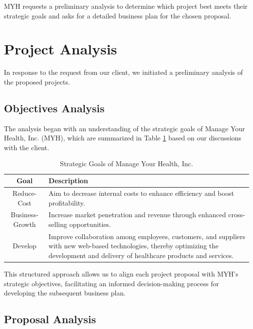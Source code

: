 MYH requests a preliminary analysis to determine which project best meets their strategic goals and asks for a detailed business plan for the chosen proposal.

\section{Project Analysis}

In response to the request from our client, we initiated a preliminary analysis of the proposed projects. 

\subsection{Objectives Analysis}

The analysis began with an understanding of the strategic goals of Manage Your Health, Inc. (MYH), which are summarized in Table \ref{tab:myh_goals} based on our discussions with the client.

\begin{table}[h]
    \centering
    \begin{tabular}{|c|p{10cm}|}
    \hline
    \textbf{Goal} & \textbf{Description} \\
    \hline
    Reduce-Cost & Aim to decrease internal costs to enhance efficiency and boost profitability. \\
    \hline
    Business-Growth & Increase market penetration and revenue through enhanced cross-selling opportunities. \\
    \hline
    Develop & Improve collaboration among employees, customers, and suppliers with new web-based technologies, thereby optimizing the development and delivery of healthcare products and services. \\
    \hline
    \end{tabular}
    \caption{Strategic Goals of Manage Your Health, Inc.}
    \label{tab:myh_goals}
\end{table}

\FloatBarrier

This structured approach allows us to align each project proposal with MYH's strategic objectives, facilitating an informed decision-making process for developing the subsequent business plan.

\subsection{Proposal Analysis}

